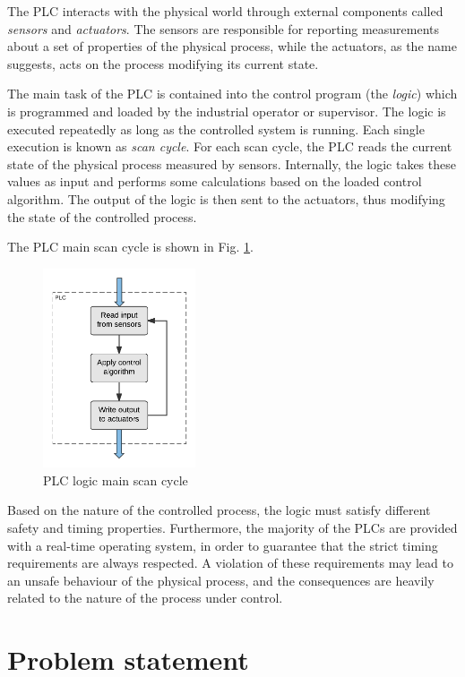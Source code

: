 The PLC interacts with the physical world through external components called \emph{sensors} and \emph{actuators}.
The sensors are responsible for reporting measurements about a set of properties of the physical process,
while the actuators, as the name suggests, acts on the process modifying its current state.

The main task of the PLC is contained into the control program (the \emph{logic}) which is programmed and loaded by the industrial operator or supervisor.
The logic is executed repeatedly as long as the controlled system is running. Each single execution is known as \emph{scan cycle}.
For each scan cycle, the PLC reads the current state of the physical process measured by sensors.
Internally, the logic takes these values as input and performs some calculations based on the loaded control algorithm.
The output of the logic is then sent to the actuators, thus modifying the state of the controlled process.

The PLC main scan cycle is shown in Fig. \ref{fig:scan_cycle}.
\begin{figure}[h]
\centerline{\includegraphics[width=0.4\textwidth]{res/scan_cycle}}
\caption{PLC logic main scan cycle\label{fig:scan_cycle}}
\end{figure}

Based on the nature of the controlled process, the logic must satisfy different safety and timing properties.
Furthermore, the majority of the PLCs are provided with a real-time operating system, in order to guarantee that the strict timing requirements are always respected.
A violation of these requirements may lead to an unsafe behaviour of the physical process, and the consequences are heavily related to the nature of the process under control.


\section{Problem statement}


